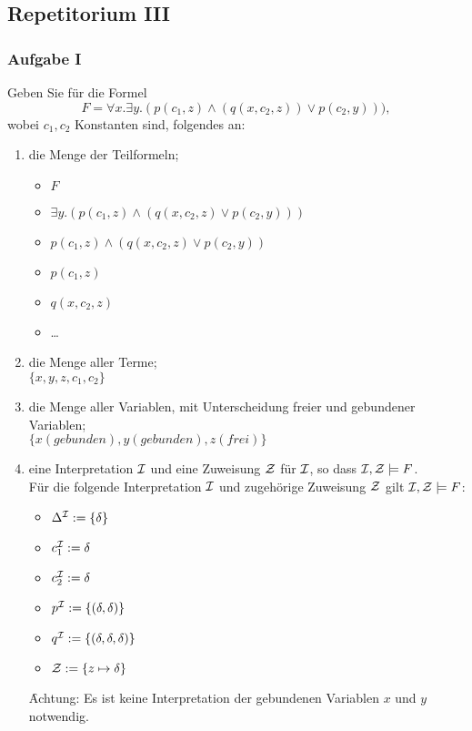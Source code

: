 \subsection*{Repetitorium III}
\subsubsection*{Aufgabe I}
Geben Sie für die Formel
\begin{equation*}
F = \forall x.\exists y.(p(c_1,z) \land (q(x,c_2,z)) \lor p(c_2,y))),
\end{equation*}
wobei $c_1,c_2$ Konstanten sind, folgendes an:
\begin{enumerate}
        \item die Menge der Teilformeln; \\
        \LOES
        \begin{itemize}
        \item $F$
        \item $\exists y.(p(c_1,z) \land (q(x, c_2, z) \lor p(c_2,y)))$
        \item $p(c_1,z) \land (q(x,c_2,z) \lor p(c_2, y))$
        \item $p(c_1, z)$
        \item $q(x,c_2,z)$
        \item \dots
        \end{itemize}
        \item die Menge aller Terme; \\
        \LOES $\{ x, y, z, c_1, c_2 \}$
        \item die Menge aller Variablen, mit Unterscheidung freier und gebundener Variablen; \\
        \LOES $\{ x (gebunden), y (gebunden), z (frei) \}$
        \item eine Interpretation $\mathcal{I}$ und eine Zuweisung $\mathcal{Z}$ für $\mathcal{I}$, so dass $\mathcal{I},\mathcal{Z} \models F$. \\
\LOES Für die folgende Interpretation $\mathcal{I}$ und zugehörige Zuweisung $\mathcal{Z}$ gilt $\mathcal{I}, \mathcal{Z} \models F$:
\begin{itemize}
        \item $\Delta^{\mathcal{I}} := \{\delta \}$
        \item $c_1^{\mathcal{I}} := \delta$
        \item $c_2^{\mathcal{I}} := \delta$
        \item $p^{\mathcal{I}} := \{(\delta,\delta)\}$
        \item $q^{\mathcal{I}} := \{(\delta,\delta,\delta)\}$
        \item $\mathcal{Z} := \{ z \mapsto \delta \}$
\end{itemize}
\f{Achtung:} Es ist keine Interpretation der gebundenen Variablen $x$ und $y$ notwendig. \\


\end{enumerate}
